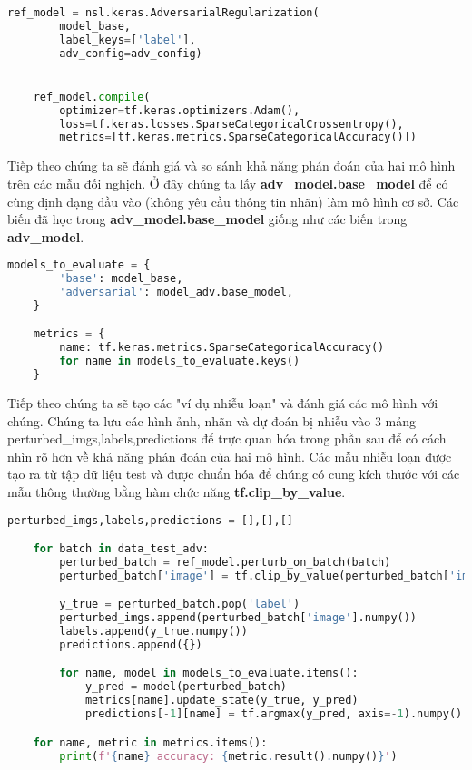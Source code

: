 \begin{lstlisting}[language = Python]
    ref_model = nsl.keras.AdversarialRegularization(
        model_base,
        label_keys=['label'],
        adv_config=adv_config)


    ref_model.compile(
        optimizer=tf.keras.optimizers.Adam(),
        loss=tf.keras.losses.SparseCategoricalCrossentropy(),
        metrics=[tf.keras.metrics.SparseCategoricalAccuracy()])
\end{lstlisting}

Tiếp theo chúng ta sẽ đánh giá và so sánh khả năng phán đoán của hai mô hình trên các mẫu đối nghịch.
Ở đây chúng ta lấy \textbf{adv\_model.base\_model} để có cùng định dạng đầu vào (không yêu cầu thông tin nhãn) làm mô hình cơ sở. Các biến đã học trong \textbf{adv\_model.base\_model} giống như các biến 
trong \textbf{adv\_model}.

\begin{lstlisting}[language = Python]
    models_to_evaluate = {
        'base': model_base,
        'adversarial': model_adv.base_model,
    }

    metrics = {
        name: tf.keras.metrics.SparseCategoricalAccuracy()
        for name in models_to_evaluate.keys()
    }    
\end{lstlisting}

Tiếp theo chúng ta sẽ tạo các "ví dụ nhiễu loạn" và đánh giá các mô hình với chúng. Chúng ta lưu các hình ảnh, nhãn và dự đoán bị nhiễu vào 3 mảng perturbed\_imgs,labels,predictions để trực 
quan hóa trong phần sau để có cách nhìn rõ hơn về khả năng phán đoán của hai mô hình. Các mẫu nhiễu loạn được tạo ra từ tập dữ liệu test và
được chuẩn hóa để chúng có cung kích thước với các mẫu thông thường bằng hàm chức năng \textbf{tf.clip\_by\_value}.


\begin{lstlisting}[language = Python]
    perturbed_imgs,labels,predictions = [],[],[]

    for batch in data_test_adv:
        perturbed_batch = ref_model.perturb_on_batch(batch)
        perturbed_batch['image'] = tf.clip_by_value(perturbed_batch['image'], 0, 1)

        y_true = perturbed_batch.pop('label')
        perturbed_imgs.append(perturbed_batch['image'].numpy())
        labels.append(y_true.numpy())
        predictions.append({})

        for name, model in models_to_evaluate.items():
            y_pred = model(perturbed_batch)
            metrics[name].update_state(y_true, y_pred)
            predictions[-1][name] = tf.argmax(y_pred, axis=-1).numpy()

    for name, metric in metrics.items():
        print(f'{name} accuracy: {metric.result().numpy()}')

\end{lstlisting}

